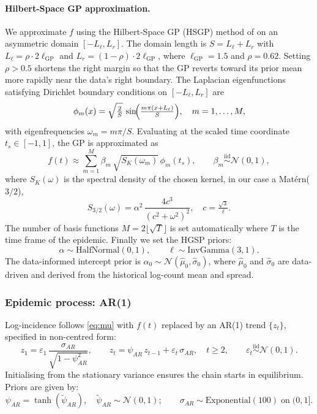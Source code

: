 \documentclass{article}
\begin{document}
\paragraph{Hilbert-Space GP approximation.}
We approximate $f$ using the Hilbert-Space GP (HSGP) method of
\cite{riutort2023practical} on an asymmetric domain $[-L_\ell, L_r]$. The domain length is $S = L_\ell + L_r$ with $L_\ell = \rho \cdot 2\ell_{\mathrm{GP}}$ and
$L_r = (1-\rho)\cdot 2\ell_{\mathrm{GP}}$, where $\ell_{\mathrm{GP}} = 1.5$ and $\rho=0.62$.
Setting $\rho > 0.5$ shortens the right margin so that the GP reverts toward its
prior mean more rapidly near the data's right boundary. The Laplacian eigenfunctions satisfying Dirichlet boundary conditions on $[-L_\ell, L_r]$
are
\begin{equation}
  \phi_m(x) = \sqrt{\tfrac{2}{S}}\,
    \sin\!\Bigl(\tfrac{m\pi(x+L_\ell)}{S}\Bigr), \quad m=1,\ldots,M,
\end{equation}
with eigenfrequencies $\omega_m = m\pi/S$.
Evaluating at the scaled time coordinate $t_s \in [-1,1]$, the GP is approximated as
\begin{equation}
  f(t) \approx \sum_{m=1}^{M} \beta_m\,\sqrt{S_K(\omega_m)}\,\phi_m(t_s),
  \qquad \beta_m \overset{\mathrm{iid}}{\sim} \mathcal{N}(0,1),
\end{equation}
where $S_K(\omega)$ is the spectral density of the chosen kernel, in our case a Matérn($3/2$),
\begin{equation}
  S_{3/2}(\omega) = \alpha^2 \,\frac{4c^3}{(c^2+\omega^2)^2}, \quad c = \tfrac{\sqrt{3}}{\ell}.
\end{equation}
The number of basis functions $M = 2\lfloor\sqrt{T}\rfloor$ is set automatically where $T$ is the time frame of the epidemic. 
Finally we set the HGSP priors:
\begin{equation}
  \alpha \sim \mathrm{HalfNormal}(0,1), \qquad
  \ell   \sim \mathrm{InvGamma}(3,1).
\end{equation}
The data-informed intercept prior is $\alpha_0 \sim \mathcal{N}(\hat\mu_0, \hat\sigma_0)$,
where $\hat\mu_0$ and $\hat\sigma_0$ are data-driven and derived from the historical log-count mean and
spread.

\subsubsection*{Epidemic process: AR(1)}

Log-incidence follows \eqref{eq:mu} with $f(t)$ replaced by an AR(1) trend
$\{z_t\}$, specified in non-centred form:
\begin{equation}
  z_1 = \varepsilon_1\,\frac{\sigma_{AR}}{\sqrt{1-\psi_{AR}^2}}, \qquad
  z_t = \psi_{AR}\,z_{t-1} + \varepsilon_t\,\sigma_{AR}, \quad t \geq 2,
  \qquad \varepsilon_t \overset{\mathrm{iid}}{\sim}\mathcal{N}(0,1).
\end{equation}
Initialising from the stationary variance ensures the chain starts in equilibrium. Priors are given by:
\begin{equation}
  \psi_{AR} = \tanh(\tilde\psi_{AR}),
  \quad \tilde\psi_{AR} \sim \mathcal{N}(0,1); \qquad
  \sigma_{AR} \sim \mathrm{Exponential}(100)\;\text{on}\;(0, 1].
\end{equation}
\end{document}
